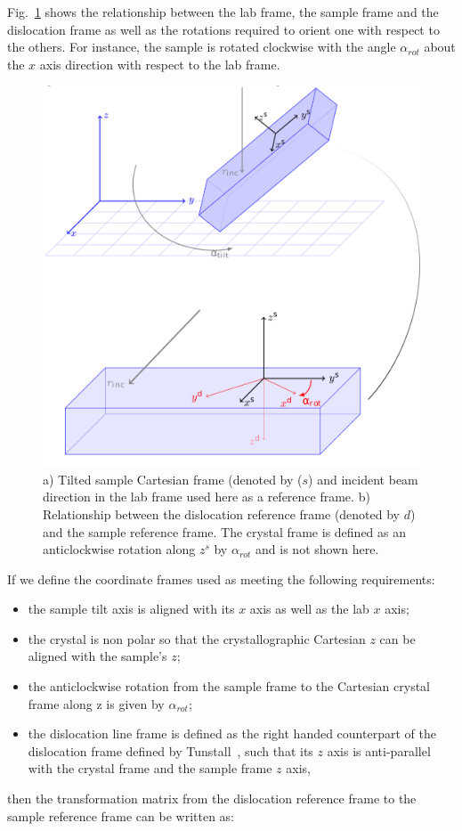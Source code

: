 Fig.~\ref{fig:sampleframe} shows the relationship between the lab frame, the sample frame and the dislocation frame as well as the rotations required to orient one with respect to the others. For instance, the sample is rotated clockwise with the angle $\alpha_{rot}$ about the $x$ axis direction with respect to the lab frame.

\begin{figure}[ht]
    \centering
    \includegraphics[width=0.78\linewidth]{Figures/calculus.png}
    \caption[Forward geometry reference frames.]{a) Tilted sample Cartesian frame (denoted by ($s$) and incident beam direction in the lab frame used here as a reference frame. b) Relationship between the dislocation reference frame (denoted by $d$) and the sample reference frame. The crystal frame is defined as an anticlockwise rotation along $z^s$ by $\alpha_{rot}$ and is not shown here.}
    \label{fig:sampleframe}
\end{figure}

If we define the coordinate frames used as meeting the following requirements:
\begin{itemize}
    \item the sample tilt axis is aligned with its $x$ axis as well as the lab $x$ axis;
    \item the crystal is non polar so that the crystallographic Cartesian $z$ can be aligned with the sample's $z$;
    \item the anticlockwise rotation from the sample frame to the Cartesian crystal frame along z is given by $\alpha_{rot}$;
    \item the dislocation line frame is defined as the right handed counterpart of the dislocation frame defined by
Tunstall~\cite{Tunstall64}, such that its $z$ axis is anti-parallel with the crystal frame and the sample frame $z$ axis,
\end{itemize}
then the transformation matrix from the dislocation reference frame to the sample reference frame can be written as:

